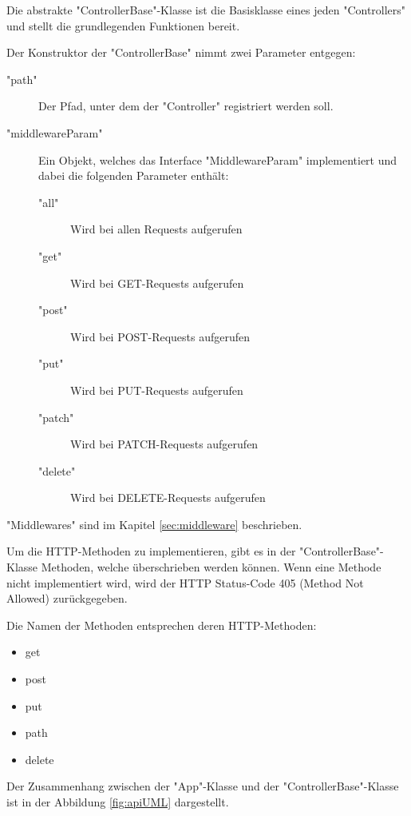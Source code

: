 
Die abstrakte "ControllerBase"-Klasse ist die Basisklasse eines jeden "Controllers" und stellt die grundlegenden Funktionen bereit. 

Der Konstruktor der "ControllerBase" nimmt zwei Parameter entgegen:

\begin{description}
    \item["path"] Der Pfad, unter dem der "Controller" registriert werden soll.
    \item["middlewareParam"] Ein Objekt, welches das Interface "MiddlewareParam" implementiert und dabei die folgenden Parameter enthält:
    \begin{description}
        \item["all"] Wird bei allen Requests aufgerufen
        \item["get"] Wird bei GET-Requests aufgerufen
        \item["post"] Wird bei POST-Requests aufgerufen
        \item["put"] Wird bei PUT-Requests aufgerufen
        \item["patch"] Wird bei PATCH-Requests aufgerufen
        \item["delete"] Wird bei DELETE-Requests aufgerufen
    \end{description}
\end{description}


"Middlewares" sind im Kapitel \ref{sec:middleware} beschrieben.

Um die HTTP-Methoden zu implementieren, gibt es in der "ControllerBase"-Klasse Methoden, welche überschrieben werden können. 
Wenn eine Methode nicht implementiert wird, wird der HTTP Status-Code 405 (Method Not Allowed) zurückgegeben.

Die Namen der Methoden entsprechen deren HTTP-Methoden:
\begin{itemize}
    \item get
    \item post
    \item put
    \item path
    \item delete
\end{itemize}

Der Zusammenhang zwischen der "App"-Klasse und der "ControllerBase"-Klasse ist in der Abbildung \ref{fig:apiUML} dargestellt.

